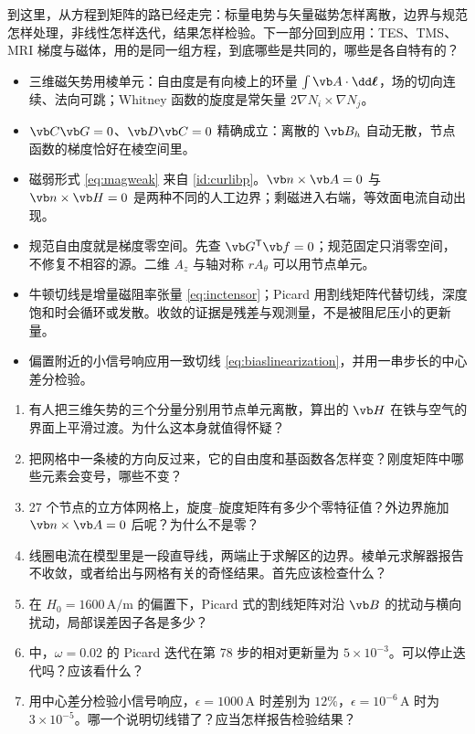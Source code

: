 到这里，从方程到矩阵的路已经走完：标量电势与矢量磁势怎样离散，边界与规范怎样处理，非线性怎样迭代，结果怎样检验。下一部分回到应用：TES、TMS、MRI 梯度与磁体，用的是同一组方程，到底哪些是共同的，哪些是各自特有的？

\begin{takeaways}
\begin{itemize}
\item 三维磁矢势用棱单元：自由度是有向棱上的环量 $\int\vb A\cdot\dd\boldsymbol\ell$，场的切向连续、法向可跳；Whitney 函数的旋度是常矢量 $2\nabla N_i\times\nabla N_j$。
\item $\vb C\vb G=0$、$\vb D\vb C=0$ 精确成立：离散的 $\vb B_h$ 自动无散，节点函数的梯度恰好在棱空间里。
\item 磁弱形式 \eqref{eq:magweak} 来自 \eqref{id:curlibp}。$\vb n\times\vb A=0$ 与 $\vb n\times\vb H=0$ 是两种不同的人工边界；剩磁进入右端，等效面电流自动出现。
\item 规范自由度就是梯度零空间。先查 $\vb G^{\mathsf T}\vb f=0$；规范固定只消零空间，不修复不相容的源。二维 $A_z$ 与轴对称 $rA_\theta$ 可以用节点单元。
\item 牛顿切线是增量磁阻率张量 \eqref{eq:inctensor}；Picard 用割线矩阵代替切线，深度饱和时会循环或发散。收敛的证据是残差与观测量，不是被阻尼压小的更新量。
\item 偏置附近的小信号响应用一致切线 \eqref{eq:biaslinearization}，并用一串步长的中心差分检验。
\end{itemize}
\end{takeaways}

\begin{selfcheck}
\begin{enumerate}
\item 有人把三维矢势的三个分量分别用节点单元离散，算出的 $\vb H$ 在铁与空气的界面上平滑过渡。为什么这本身就值得怀疑？
\item 把网格中一条棱的方向反过来，它的自由度和基函数各怎样变？刚度矩阵中哪些元素会变号，哪些不变？
\item 27 个节点的立方体网格上，旋度--旋度矩阵有多少个零特征值？外边界施加 $\vb n\times\vb A=0$ 后呢？为什么不是零？
\item 线圈电流在模型里是一段直导线，两端止于求解区的边界。棱单元求解器报告不收敛，或者给出与网格有关的奇怪结果。首先应该检查什么？
\item 在 $H_0=1600\,\mathrm{A/m}$ 的偏置下，Picard 式的割线矩阵对沿 $\vb B$ 的扰动与横向扰动，局部误差因子各是多少？
\item {} 中，$\omega=0.02$ 的 Picard 迭代在第 78 步的相对更新量为 $5\times10^{-3}$。可以停止迭代吗？应该看什么？
\item 用中心差分检验小信号响应，$\epsilon=1000\,\mathrm A$ 时差别为 $12\%$，$\epsilon=10^{-6}\,\mathrm A$ 时为 $3\times10^{-5}$。哪一个说明切线错了？应当怎样报告检验结果？
\end{enumerate}
\end{selfcheck}


